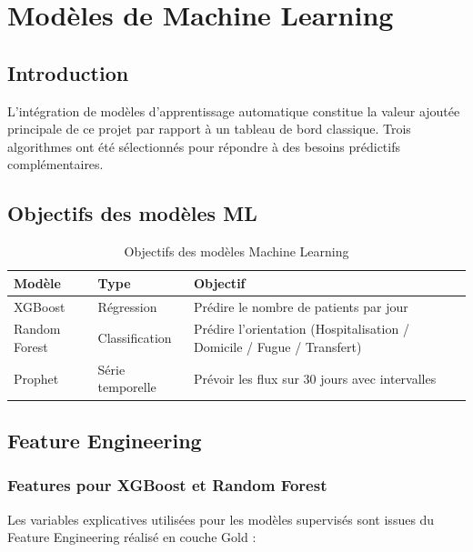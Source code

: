 \documentclass[12pt,a4paper]{report}
\begin{document}
	\chapter{Modèles de Machine Learning}
	
	\section{Introduction}
	
	L'intégration de modèles d'apprentissage automatique constitue la valeur ajoutée principale
	de ce projet par rapport à un tableau de bord classique. Trois algorithmes ont été sélectionnés
	pour répondre à des besoins prédictifs complémentaires.
	
	\section{Objectifs des modèles ML}
	
	\begin{table}[H]
		\centering
		\caption{Objectifs des modèles Machine Learning}
		\renewcommand{\arraystretch}{1.2}
		\begin{tabularx}{\textwidth}{llX}
			\toprule
			\textbf{Modèle} & \textbf{Type} & \textbf{Objectif} \\
			\midrule
			XGBoost      & Régression          & Prédire le nombre de patients par jour \\
			Random Forest & Classification      & Prédire l'orientation (Hospitalisation / Domicile / Fugue / Transfert) \\
			Prophet      & Série temporelle    & Prévoir les flux sur 30 jours avec intervalles \\
			\bottomrule
		\end{tabularx}
	\end{table}
	\newpage
	\section{Feature Engineering}
	
	\subsection{Features pour XGBoost et Random Forest}
	
	Les variables explicatives utilisées pour les modèles supervisés sont issues du Feature
	Engineering réalisé en couche Gold :
	
\end{document}
